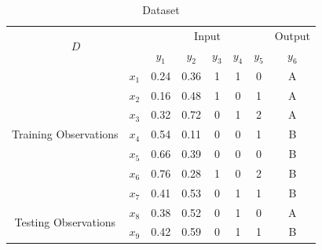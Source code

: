 \documentclass{article}
\begin{document}
\begin{table}[h!]
\centering
\begin{tabular}{|cc|ccccc|c|}
\hline
\multicolumn{2}{|c|}{\multirow{2}{*}{$D$}}                           & \multicolumn{5}{c|}{Input}                                                                                                & \multicolumn{1}{l|}{Output} \\ \cline{3-8} 
\multicolumn{2}{|c|}{}                                               & \multicolumn{1}{c|}{$y_1$} & \multicolumn{1}{c|}{$y_2$} & \multicolumn{1}{c|}{$y_3$} & \multicolumn{1}{c|}{$y_4$} & $y_5$ & $y_6$                       \\ \hline
\multicolumn{1}{|c|}{\multirow{7}{*}{Training Observations}} & $x_1$ & \multicolumn{1}{c|}{0.24}  & \multicolumn{1}{c|}{0.36}  & \multicolumn{1}{c|}{1}     & \multicolumn{1}{c|}{1}     & 0     & A                           \\ \cline{2-8} 
\multicolumn{1}{|c|}{}                                       & $x_2$ & \multicolumn{1}{c|}{0.16}  & \multicolumn{1}{c|}{0.48}  & \multicolumn{1}{c|}{1}     & \multicolumn{1}{c|}{0}     & 1     & A                           \\ \cline{2-8} 
\multicolumn{1}{|c|}{}                                       & $x_3$ & \multicolumn{1}{c|}{0.32}  & \multicolumn{1}{c|}{0.72}  & \multicolumn{1}{c|}{0}     & \multicolumn{1}{c|}{1}     & 2     & A                           \\ \cline{2-8} 
\multicolumn{1}{|c|}{}                                       & $x_4$ & \multicolumn{1}{c|}{0.54}  & \multicolumn{1}{c|}{0.11}  & \multicolumn{1}{c|}{0}     & \multicolumn{1}{c|}{0}     & 1     & B                           \\ \cline{2-8} 
\multicolumn{1}{|c|}{}                                       & $x_5$ & \multicolumn{1}{c|}{0.66}  & \multicolumn{1}{c|}{0.39}  & \multicolumn{1}{c|}{0}     & \multicolumn{1}{c|}{0}     & 0     & B                           \\ \cline{2-8} 
\multicolumn{1}{|c|}{}                                       & $x_6$ & \multicolumn{1}{c|}{0.76}  & \multicolumn{1}{c|}{0.28}  & \multicolumn{1}{c|}{1}     & \multicolumn{1}{c|}{0}     & 2     & B                           \\ \cline{2-8} 
\multicolumn{1}{|c|}{}                                       & $x_7$ & \multicolumn{1}{c|}{0.41}  & \multicolumn{1}{c|}{0.53}  & \multicolumn{1}{c|}{0}     & \multicolumn{1}{c|}{1}     & 1     & B                           \\ \hline
\multicolumn{1}{|c|}{\multirow{2}{*}{Testing Observations}}  & $x_8$ & \multicolumn{1}{c|}{0.38}  & \multicolumn{1}{c|}{0.52}  & \multicolumn{1}{c|}{0}     & \multicolumn{1}{c|}{1}     & 0     & A                           \\ \cline{2-8} 
\multicolumn{1}{|c|}{}                                       & $x_9$ & \multicolumn{1}{c|}{0.42}  & \multicolumn{1}{c|}{0.59}  & \multicolumn{1}{c|}{0}     & \multicolumn{1}{c|}{1}     & 1     & B                           \\ \hline
\end{tabular}
\label{tab:dataset1}
\caption{Dataset}
\end{table}
\end{document}
